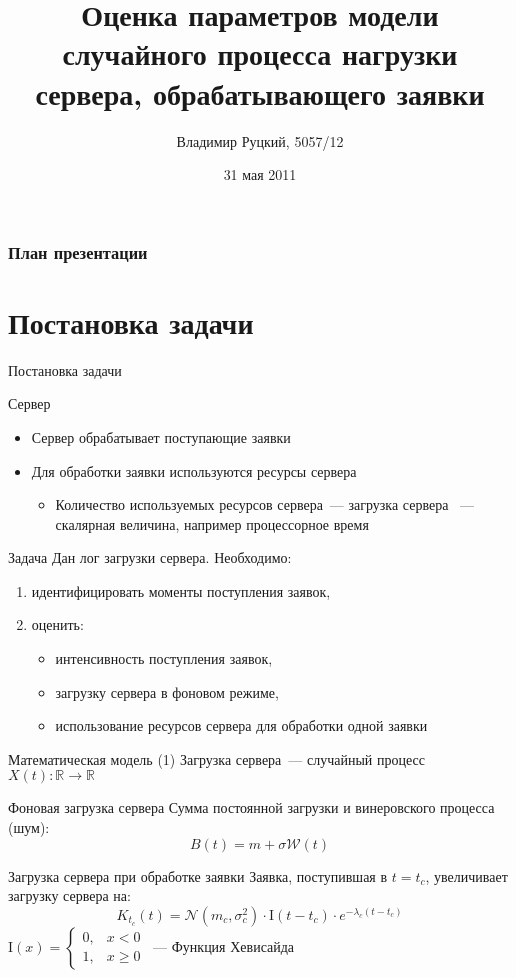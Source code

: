 \documentclass[utf8,handout]{beamer}
\title[Оценка параметров случайного процесса]{Оценка параметров модели случайного процесса нагрузки сервера, обрабатывающего заявки}
\author{Владимир Руцкий, 5057/12}
\institute[СПбГПУ]{Санкт-Петербургский государственный политехнический университет}
\date{31 мая 2011}
\begin{document}
\begin{frame}
\titlepage
\end{frame}


\begin{frame}
\frametitle{План презентации}
\tableofcontents
\end{frame}


\section{Постановка задачи}
\begin{frame}{Постановка задачи}
\begin{block}{Сервер}
  \begin{itemize}
    \item Сервер обрабатывает поступающие заявки
    \item Для обработки заявки используются ресурсы сервера
      \begin{itemize}
        \item Количество используемых ресурсов сервера~--- загрузка сервера ~--- скалярная величина, например процессорное время
      \end{itemize}
  \end{itemize}
\end{block}

\begin{block}{Задача}
  Дан лог загрузки сервера. 
  Необходимо:
  \begin{enumerate}
    \item идентифицировать моменты поступления заявок,
    \item оценить:
      \begin{itemize}
        \item интенсивность поступления заявок,
        \item загрузку сервера в фоновом режиме,
        \item использование ресурсов сервера для обработки одной заявки
      \end{itemize}
  \end{enumerate}
\end{block}
\end{frame}


\begin{frame}{Математическая модель (1)}
Загрузка сервера~--- случайный процесс $X(t)\colon \mathbb{R} \rightarrow \mathbb{R}$
\begin{block}{Фоновая загрузка сервера}
  Сумма постоянной загрузки и винеровского процесса (шум): 
  $$B(t) = m + \sigma \mathcal{W}(t)$$
\end{block}
\begin{block}{Загрузка сервера при обработке заявки}
  Заявка, поступившая в $t=t_c$, увеличивает загрузку сервера на:
  $$K_{t_c}(t) = \mathcal{N}(m_c, \sigma_c^2) \cdot \mathrm{I}(t - t_c) \cdot 
    e^{-\lambda_c(t - t_c)}$$
  {\footnotesize $\mathrm{I}(x) = \left\{
    \begin{array}{rl}
      0, & x < 0 \\
      1, & x \geqslant 0
    \end{array}\right.$~--- Функция Хевисайда}
\end{block}
\end{frame}
\end{document}
